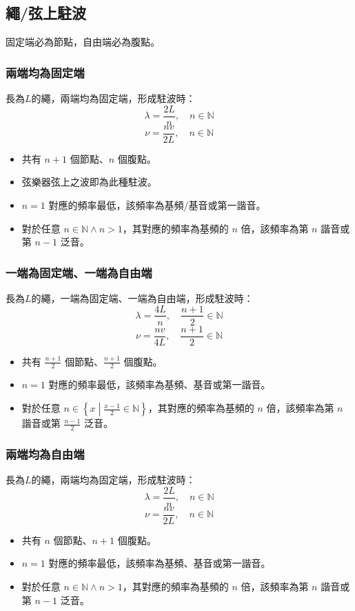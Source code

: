 \documentclass[a4paper,12pt]{report}
\begin{document}
\subsection{繩/弦上駐波}
固定端必為節點，自由端必為腹點。
\subsubsection{兩端均為固定端}
長為$L$的繩，兩端均為固定端，形成駐波時：
\[\lambda = \frac{2L}{n},\quad n\in\mathbb{N} \]
\[\nu = \frac{nv}{2L},\quad n\in\mathbb{N} \]
\begin{itemize}
\item 共有 $n+1$ 個節點、$n$ 個腹點。
\item 弦樂器弦上之波即為此種駐波。
\item $n=1$ 對應的頻率最低，該頻率為基頻/基音或第一諧音。
\item 對於任意 $n\in\mathbb{N}\land n>1$，其對應的頻率為基頻的 $n$ 倍，該頻率為第 $n$ 諧音或第 $n-1$ 泛音。
\end{itemize}
\subsubsection{一端為固定端、一端為自由端}
長為$L$的繩，一端為固定端、一端為自由端，形成駐波時：
\[\lambda = \frac{4L}{n},\quad \frac{n+1}{2}\in\mathbb{N} \]
\[\nu = \frac{nv}{4L},\quad \frac{n+1}{2}\in\mathbb{N} \]
\begin{itemize}
\item 共有 $\frac{n+1}{2}$ 個節點、$\frac{n+1}{2}$ 個腹點。
\item $n=1$ 對應的頻率最低，該頻率為基頻、基音或第一諧音。
\item 對於任意 $n\in\left\{x\middle|\frac{x-1}{2}\in\mathbb{N}\right\}$，其對應的頻率為基頻的 $n$ 倍，該頻率為第 $n$ 諧音或第 $\frac{n-1}{2}$ 泛音。
\end{itemize}
\subsubsection{兩端均為自由端}
長為$L$的繩，兩端均為固定端，形成駐波時：
\[\lambda = \frac{2L}{n},\quad n\in\mathbb{N} \]
\[\nu = \frac{nv}{2L},\quad n\in\mathbb{N} \]
\begin{itemize}
\item 共有 $n$ 個節點、$n+1$ 個腹點。
\item $n=1$ 對應的頻率最低，該頻率為基頻、基音或第一諧音。
\item 對於任意 $n\in\mathbb{N}\land n>1$，其對應的頻率為基頻的 $n$ 倍，該頻率為第 $n$ 諧音或第 $n-1$ 泛音。
\end{itemize}
\end{document}

